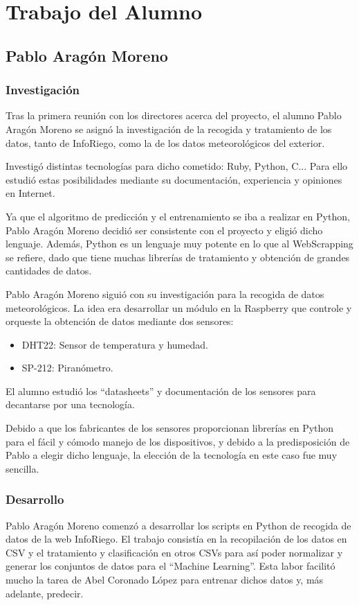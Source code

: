 \cleardoublepage

\chapter{Trabajo del Alumno}
\label{makereference11}

\section{Pablo Aragón Moreno}
\subsection{Investigación}
Tras la primera reunión con los directores acerca del proyecto, el alumno Pablo Aragón Moreno se asignó la investigación de la recogida y tratamiento de los datos, tanto de InfoRiego, como la de los datos meteorológicos del exterior.

Investigó distintas tecnologías para dicho cometido: Ruby, Python, C... Para ello estudió estas posibilidades mediante su documentación, experiencia y opiniones en Internet.

Ya que el algoritmo de predicción y el entrenamiento se iba a realizar en Python, Pablo Aragón Moreno decidió ser consistente con el proyecto y eligió dicho lenguaje. Además, Python es un lenguaje muy potente en lo que al WebScrapping se refiere, dado que tiene muchas librerías de tratamiento y obtención de grandes cantidades de datos.

Pablo Aragón Moreno siguió con su investigación para la recogida de datos meteorológicos. La idea era desarrollar un módulo en la Raspberry que controle y orqueste la obtención de datos mediante dos sensores:

\begin{itemize}
\item DHT22: Sensor de temperatura y humedad.
\item SP-212: Piranómetro.
\end{itemize}

El alumno estudió los ``datasheets'' y documentación de los sensores para decantarse por una tecnología.

Debido a que los fabricantes de los sensores proporcionan librerías en Python para el fácil y cómodo manejo de los dispositivos, y debido a la predisposición de Pablo a elegir dicho lenguaje, la elección de la tecnología en este caso fue muy sencilla.

\subsection{Desarrollo}
Pablo Aragón Moreno comenzó a desarrollar los scripts en Python de recogida de datos de la web InfoRiego. El trabajo consistía en la recopilación de los datos en CSV y el tratamiento y clasificación en otros CSVs para así poder normalizar y generar los conjuntos de datos para el ``Machine Learning''. Esta labor facilitó mucho la tarea de Abel Coronado López para entrenar dichos datos y, más adelante, predecir.

